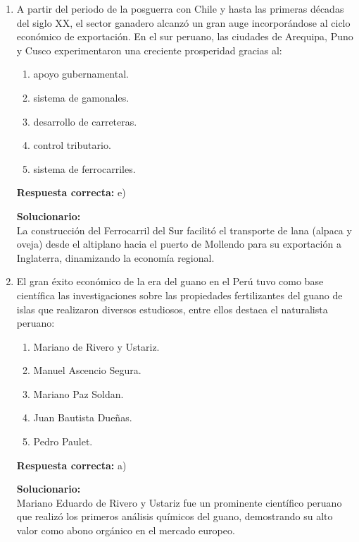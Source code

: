 \begin{enumerate}
	\item A partir del periodo de la posguerra con Chile y hasta las primeras décadas del siglo XX, el sector ganadero alcanzó un gran auge incorporándose al ciclo económico de exportación. En el sur peruano, las ciudades de Arequipa, Puno y Cusco experimentaron una creciente prosperidad gracias al:
	\begin{enumerate}[label=\alph*)]
		\item apoyo gubernamental.
		\item sistema de gamonales.
		\item desarrollo de carreteras.
		\item control tributario.
		\item sistema de ferrocarriles.
	\end{enumerate}
	\textbf{Respuesta correcta:} e)
	
	\vspace{2mm}
	\textbf{Solucionario:}\\
	La construcción del Ferrocarril del Sur facilitó el transporte de lana (alpaca y oveja) desde el altiplano hacia el puerto de Mollendo para su exportación a Inglaterra, dinamizando la economía regional.
	
	\vspace{6mm}
	
	\item El gran éxito económico de la era del guano en el Perú tuvo como base científica las investigaciones sobre las propiedades fertilizantes del guano de islas que realizaron diversos estudiosos, entre ellos destaca el naturalista peruano:
	\begin{enumerate}[label=\alph*)]
		\item Mariano de Rivero y Ustariz.
		\item Manuel Ascencio Segura.
		\item Mariano Paz Soldan.
		\item Juan Bautista Dueñas.
		\item Pedro Paulet.
	\end{enumerate}
	\textbf{Respuesta correcta:} a)
	
	\vspace{2mm}
	\textbf{Solucionario:}\\
	Mariano Eduardo de Rivero y Ustariz fue un prominente científico peruano que realizó los primeros análisis químicos del guano, demostrando su alto valor como abono orgánico en el mercado europeo.
	

\end{enumerate}
